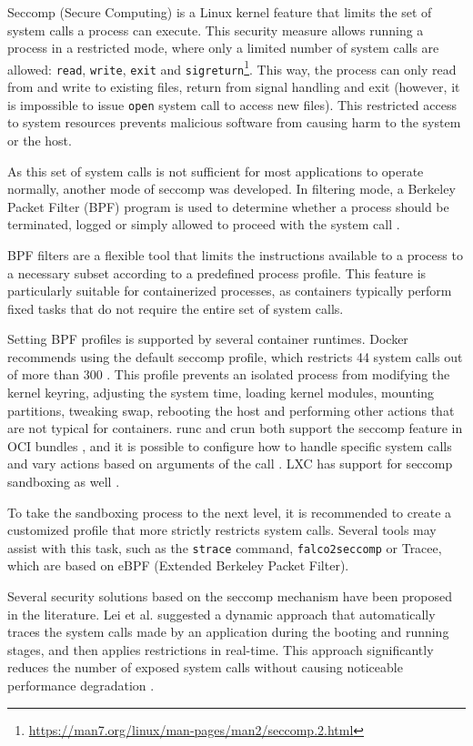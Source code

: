Seccomp (Secure Computing) is a Linux kernel feature that limits the set of system calls a process can execute. This security measure allows running a process in a restricted mode, where only a limited number of system calls are allowed: \texttt{read}, \texttt{write}, \texttt{exit} and \texttt{sigreturn}\footnote{\url{https://man7.org/linux/man-pages/man2/seccomp.2.html}}. This way, the process can only read from and write to existing files, return from signal handling and exit (however, it is impossible to issue \texttt{open} system call to access new files). This restricted access to system resources prevents malicious software from causing harm to the system or the host.

As this set of system calls is not sufficient for most applications to operate normally, another mode of seccomp was developed. In filtering mode, a Berkeley Packet Filter (BPF) program is used to determine whether a process should be terminated, logged or simply allowed to proceed with the system call \cite{d:kernelseccomp}.

BPF filters are a flexible tool that limits the instructions available to a process to a necessary subset according to a predefined process profile. This feature is particularly suitable for containerized processes, as containers typically perform fixed tasks that do not require the entire set of system calls.

Setting BPF profiles is supported by several container runtimes. Docker recommends using the default seccomp profile, which restricts 44 system calls out of more than 300 \cite{d:dockerseccomp}. This profile prevents an isolated process from modifying the kernel keyring, adjusting the system time, loading kernel modules, mounting partitions, tweaking swap, rebooting the host and performing other actions that are not typical for containers. runc and crun both support the seccomp feature in OCI bundles \cite{d:ocilinux}, and it is possible to configure how to handle specific system calls and vary actions based on arguments of the call \cite{s:lxcseccomp}. LXC has support for seccomp sandboxing as well \cite{s:what-is-selinux}.

To take the sandboxing process to the next level, it is recommended to create a customized profile that more strictly restricts system calls. Several tools may assist with this task, such as the \texttt{strace} command, \texttt{falco2seccomp} or Tracee, which are based on eBPF (Extended Berkeley Packet Filter).

Several security solutions based on the seccomp mechanism have been proposed in the literature. Lei et al. suggested a dynamic approach that automatically traces the system calls made by an application during the booting and running stages, and then applies restrictions in real-time. This approach significantly reduces the number of exposed system calls without causing noticeable performance degradation \cite{spr:2}.

